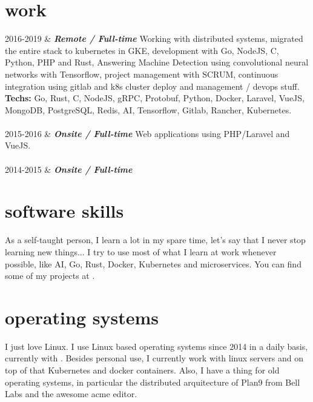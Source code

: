 \documentclass[]{cv-mauri}
\begin{document}
\section*{work}
\begin{tabularcv}
    2016-2019   &   
                    \textbf{\textit{Remote / Full-time}}
                    \newline
                    Working with distributed systems, migrated the entire stack to kubernetes in GKE, development with Go, NodeJS, C, Python, PHP and Rust, Answering Machine Detection using convolutional neural networks with Tensorflow, project management with SCRUM, continuous integration using gitlab and k8s cluster deploy and management / devops stuff.
                    \newline
                    \textbf{Techs:} Go, Rust, C, NodeJS, gRPC, Protobuf, Python, Docker, Laravel, VueJS, MongoDB, PostgreSQL, Redis, AI, Tensorflow, Gitlab, Rancher, Kubernetes.
                    \\[\vspacepar]
                    \\[\vspacepar]
    2015-2016   &   
				    \textbf{\textit{Onsite / Full-time}}
                    \newline
                    Web applications using PHP/Laravel and VueJS.
                    \\[\vspacepar]
                    \\[\vspacepar]
	2014-2015   &   
					\textbf{\textit{Onsite / Full-time}}
\end{tabularcv}

\section*{software skills}
    As a self-taught person, I learn a lot in my spare time, let's say that I never stop learning new things... I try to use most of what I learn at work whenever possible, like AI, Go, Rust, Docker, Kubernetes and microservices. You can find some of my projects at \href{https://mauri870.github.io}{\color{maincolor}{https://mauri870.github.io}}.

\section*{operating systems}
	I just love Linux. I use Linux based operating systems since 2014 in a daily basis, currently with \href{https://github.com/mauri870/dot-files}{\color{maincolor}{Arch linux and i3wm }}. Besides personal use, I currently work with linux servers and on top of that Kubernetes and docker containers. Also, I have a thing for old operating systems, in particular the distributed arquitecture of Plan9 from Bell Labs and the awesome acme editor.
\end{document}
